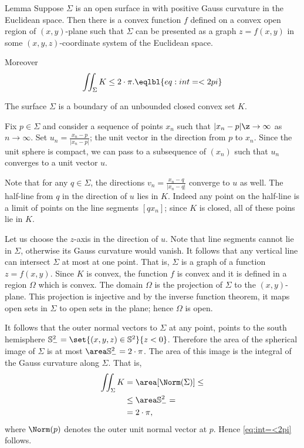 \begin{thm}{Lemma}\label{lem:graph}
Suppose $\Sigma$ is an open surface in with positive Gauss curvature in the Euclidean space.
Then there is a convex function $f$ defined on a convex open region of $(x,y)$-plane 
such that $\Sigma$ can be presented as a graph $z=f(x,y)$ in some $(x,y,z)$-coordinate system of the Euclidean space.

Moreover 
\[\iint_\Sigma K\le 2\cdot\pi.\eqlbl{eq:int=<2pi}\]

\end{thm}

The surface $\Sigma$ is a boundary of an unbounded closed convex set $K$.

Fix $p\in \Sigma$ and consider a sequence of points $x_n$ such that $|x_n-p|\z\to \infty$ as $n\to \infty$.
Set $u_n=\tfrac{x_n-p}{|x_n-p|}$; the unit vector in the direction from $p$ to $x_n$.
Since the unit sphere is compact, we can pass to a subsequence of $(x_n)$ such that $u_n$ converges to a unit vector $u$.

Note that for any $q\in \Sigma$, the directions $v_n=\tfrac{x_n-q}{|x_n-q|}$ converge to $u$ as well.
The half-line from $q$ in the direction of $u$ lies in $K$.
Indeed any point on the half-line is a limit of points on the line segments $[qx_n]$;
since $K$ is closed, all of these poins lie in $K$.


Let us choose the $z$-axis in the direction of $u$.
Note that line segments cannot lie in $\Sigma$, otherwise its Gauss curvature would vanish.
It follows that any vertical line can intersect $\Sigma$ at most at one point.
That is, $\Sigma$ is a graph of a function $z=f(x,y)$.
Since $K$ is convex, the function $f$ is convex and it is defined in a region $\Omega$ which is convex.
The domain $\Omega$ is the projection of $\Sigma$ to the $(x,y)$-plane.
This projection is injective and by the inverse function theorem, it maps open sets in $\Sigma$ to open sets in the plane;
hence $\Omega$ is open.

It follows that the outer normal vectors to $\Sigma$ at any point, points to the south hemisphere $\mathbb{S}^2_-=\set{(x,y,z)\in\mathbb{S}^2}{z< 0}$.
Therefore the area of the spherical image of $\Sigma$ is at most $\area\mathbb{S}^2_-= 2\cdot\pi$.
The area of this image is the integral of the Gauss curvature along $\Sigma$.
That is,
\begin{align*}
\iint_{\Sigma}K&=\area[\Norm(\Sigma)]\le 
\\
&\le \area\mathbb{S}^2_-=
\\
&=2\cdot\pi,
\end{align*}
where $\Norm(p)$ denotes the outer unit normal vector at $p$.
Hence \ref{eq:int=<2pi} follows.
\qeds

























